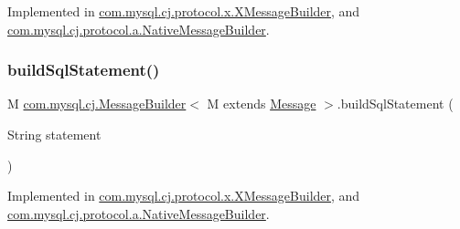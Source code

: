 Implemented in \mbox{\hyperlink{classcom_1_1mysql_1_1cj_1_1protocol_1_1x_1_1_x_message_builder_af62045f3c8ab379984af2dc1dbc19059}{com.\+mysql.\+cj.\+protocol.\+x.\+X\+Message\+Builder}}, and \mbox{\hyperlink{classcom_1_1mysql_1_1cj_1_1protocol_1_1a_1_1_native_message_builder_abf38281f5fca836c56d94270cad2fcde}{com.\+mysql.\+cj.\+protocol.\+a.\+Native\+Message\+Builder}}.

\mbox{\label{interfacecom_1_1mysql_1_1cj_1_1_message_builder_ab18c136ad40edd22c321cae8c222e6ad}} 
\subsubsection{\texorpdfstring{build\+Sql\+Statement()}{buildSqlStatement()}\hspace{0.1cm}{\footnotesize\ttfamily [1/2]}}
{\footnotesize\ttfamily M \mbox{\hyperlink{interfacecom_1_1mysql_1_1cj_1_1_message_builder}{com.\+mysql.\+cj.\+Message\+Builder}}$<$ M extends \mbox{\hyperlink{interfacecom_1_1mysql_1_1cj_1_1protocol_1_1_message}{Message}} $>$.build\+Sql\+Statement (\begin{DoxyParamCaption}\item[{String}]{statement }\end{DoxyParamCaption})}



Implemented in \mbox{\hyperlink{classcom_1_1mysql_1_1cj_1_1protocol_1_1x_1_1_x_message_builder_a60e482092bcdce0fd60ecd466daed306}{com.\+mysql.\+cj.\+protocol.\+x.\+X\+Message\+Builder}}, and \mbox{\hyperlink{classcom_1_1mysql_1_1cj_1_1protocol_1_1a_1_1_native_message_builder_ab1496adef336023770d4c587bdd4af49}{com.\+mysql.\+cj.\+protocol.\+a.\+Native\+Message\+Builder}}.

\mbox{\label{interfacecom_1_1mysql_1_1cj_1_1_message_builder_a592efa3bace2a15138d4bed34dd37e28}} 

